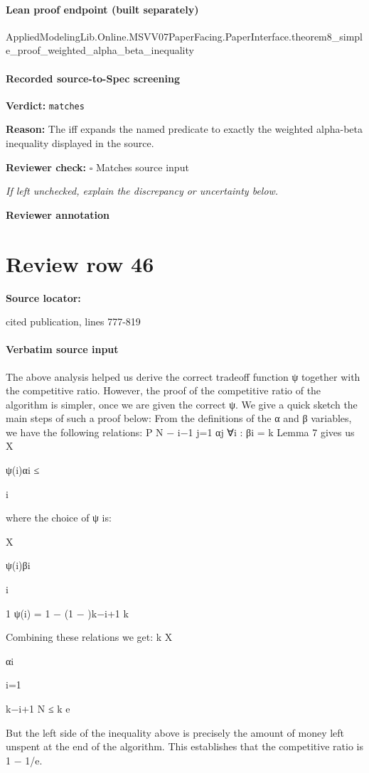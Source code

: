 \documentclass[10pt]{article}
\newcommand{\reviewerbox}{%
  \par\noindent\fbox{\parbox{0.96\linewidth}{\rule{0pt}{0.38in}}}\par
}
\newcommand{\reviewmatch}[1]{%
  \par\noindent\textbf{Reviewer check:} $\square$\; #1\par
  \noindent\emph{If left unchecked, explain the discrepancy or uncertainty below.}\par
}
\begin{document}
\paragraph{Lean proof endpoint (built separately)}\begin{ReviewVerbatim}
AppliedModelingLib.Online.MSVV07PaperFacing.PaperInterface.theorem8_simple_proof_weighted_alpha_beta_inequality
\end{ReviewVerbatim}

\paragraph{Recorded source-to-Spec screening}
\textbf{Verdict:} \texttt{matches}
\\
{\raggedright
\textbf{Reason:} The iff expands the named predicate to exactly the weighted alpha-\allowbreak{}beta inequality displayed in the source.\allowbreak{}
\par}
\reviewmatch{Matches source input}
\noindent\textbf{Reviewer annotation}\par
\reviewerbox
\clearpage
\hypertarget{source-claim-4901b9feb2aff9e9}{}
\section*{Review row 46}
\textbf{Source locator:} {\footnotesize\raggedright cited publication, lines 777-\allowbreak{}819\par}
\paragraph{Verbatim source input}
\begin{ReviewVerbatim}
The above analysis helped us derive the correct tradeoff function ψ together with the competitive ratio. However, the proof of the competitive ratio of the algorithm is simpler, once we
are given the correct ψ. We give a quick sketch the main steps of such a proof below:
From the definitions of the α and β variables, we have the following relations:
P
N − i−1
j=1 αj
∀i : βi =
k
Lemma 7 gives us
X

ψ(i)αi ≤

i

where the choice of ψ is:

X

ψ(i)βi

i

1
ψ(i) = 1 − (1 − )k−i+1
k

Combining these relations we get:
k
X

αi

i=1

k−i+1
N
≤
k
e

But the left side of the inequality above is precisely the amount of money left unspent at the
end of the algorithm. This establishes that the competitive ratio is 1 − 1/e.
\end{ReviewVerbatim}
\end{document}
